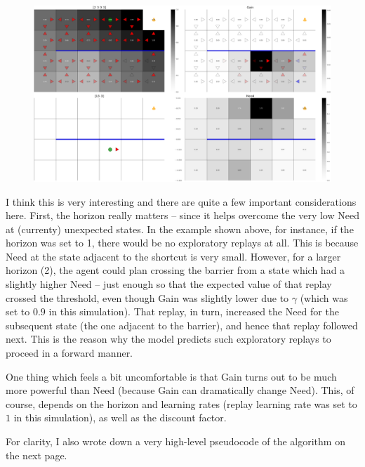 \documentclass{article}
\begin{document}
\begin{figure}[ht!]
    \centering
    \includegraphics[width=1\textwidth]{../../../data/plots/move_3001_5.png}
\end{figure}

\clearpage

I think this is very interesting and there are quite a few important considerations here. First, the horizon really 
matters -- since it helps overcome the very low Need at (currenty) unexpected states. In the example shown above, 
for instance, if the horizon was set to 1, there would be no exploratory replays at all. This is because Need at the 
state adjacent to the shortcut is very small. However, for a larger horizon (2), the agent could plan crossing the 
barrier from a state which had a slightly higher Need -- just enough so that the expected value of that replay crossed 
the threshold, even though Gain was slightly lower due to $\gamma$ (which was set to $0.9$ in this simulation). That replay, in turn, 
increased the Need for the subsequent state (the one adjacent to the barrier), and hence that replay followed next. This 
is the reason why the model predicts such exploratory replays to proceed in a forward manner. 

\bigbreak

One thing which feels a bit uncomfortable is that Gain turns out to be much more powerful than Need (because Gain can dramatically change 
Need). This, of course, depends on the horizon and learning rates (replay learning rate was set to $1$ in this simulation), as well as 
the discount factor.

\bigbreak

For clarity, I also wrote down a very high-level pseudocode of the algorithm on the next page.
\end{document}
